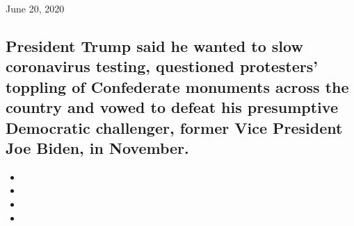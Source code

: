 June 20, 2020

\hypertarget{president-trump-said-he-wanted-to-slow-coronavirus-testing-questioned-protesters-toppling-of-confederate-monuments-across-the-country-and-vowed-to-defeat-his-presumptive-democratic-challenger-former-vice-president-joe-biden-in-november-1}{%
\subsection{President Trump said he wanted to slow coronavirus testing,
questioned protesters' toppling of Confederate monuments across the
country and vowed to defeat his presumptive Democratic challenger,
former Vice President Joe Biden, in
November.}\label{president-trump-said-he-wanted-to-slow-coronavirus-testing-questioned-protesters-toppling-of-confederate-monuments-across-the-country-and-vowed-to-defeat-his-presumptive-democratic-challenger-former-vice-president-joe-biden-in-november-1}}

\begin{itemize}
\item
\item
\item
\item
\end{itemize}

